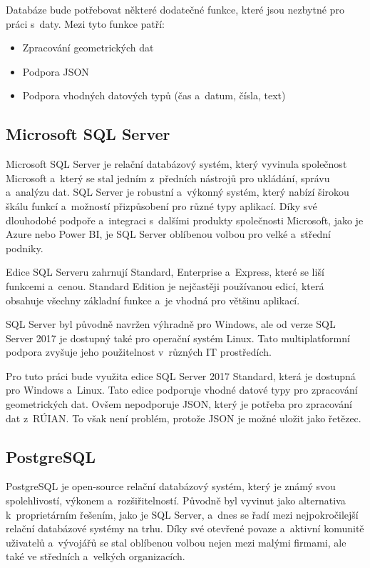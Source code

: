 Databáze bude potřebovat některé dodatečné funkce, které jsou nezbytné pro práci s~daty.
Mezi tyto funkce patří:
\begin{itemize}
    \item Zpracování geometrických dat
    \item Podpora JSON
    \item Podpora vhodných datových typů (čas a~datum, čísla, text)
\end{itemize}

\subsection{Microsoft SQL Server}
Microsoft SQL Server je relační databázový systém, který vyvinula společnost 
Microsoft a~který se stal jedním z~předních nástrojů pro ukládání, správu a~analýzu dat. 
SQL Server je robustní a~výkonný systém, který nabízí širokou škálu funkcí 
a~možností přizpůsobení pro různé typy aplikací. Díky své dlouhodobé podpoře a~integraci 
s~dalšími produkty společnosti Microsoft, jako je Azure nebo Power BI, je SQL Server 
oblíbenou volbou pro velké a~střední podniky.

Edice SQL Serveru zahrnují Standard, Enterprise a~Express, 
které se liší funkcemi a~cenou. Standard Edition je nejčastěji používanou edicí, 
která obsahuje všechny základní funkce a~je vhodná pro většinu aplikací.

SQL Server byl původně navržen výhradně pro Windows, ale od verze SQL Server 2017 je dostupný 
také pro operační systém Linux. Tato multiplatformní podpora zvyšuje jeho použitelnost 
v~různých IT prostředích.
\cite{microsoft_sql_server}

Pro tuto práci bude využita edice SQL Server 2017 Standard, která je dostupná pro Windows a~Linux.
Tato edice podporuje vhodné datové typy pro zpracování geometrických dat.
Ovšem nepodporuje JSON, který je potřeba pro zpracování dat z~RÚIAN.
To však není problém, protože JSON je možné uložit jako řetězec.

\subsection{PostgreSQL}
PostgreSQL je open-source relační databázový systém, který je známý svou spolehlivostí, výkonem 
a~rozšiřitelností. Původně byl vyvinut jako alternativa k~proprietárním řešením, jako je SQL Server, 
a~dnes se řadí mezi nejpokročilejší relační databázové systémy na trhu. Díky své otevřené povaze 
a~aktivní komunitě uživatelů a~vývojářů se stal oblíbenou volbou nejen mezi malými firmami, 
ale také ve středních a~velkých organizacích.

